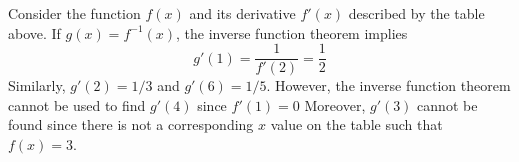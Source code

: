 \documentclass[12pt]{article}
\numberwithin{equation}{section}
\begin{document}
\noindent Consider the function $f(x)$ and its derivative $f'(x)$ described by the table above. If $g(x) = f^{-1}(x)$, the inverse function theorem implies \[g'(1) = \frac{1}{f'(2)} = \frac{1}{2}\] Similarly, $g'(2) = 1/3$ and $g'(6) = 1/5$. However, the inverse function theorem cannot be used to find $g'(4)$ since $f'(1) = 0$ Moreover, $g'(3)$ cannot be found since there is not a corresponding $x$ value on the table such that $f(x) = 3$. 
\end{document}
